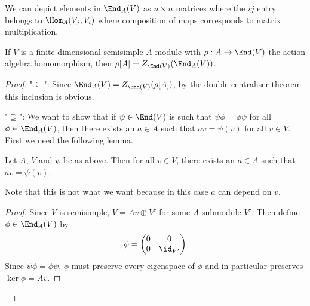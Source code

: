 \begin{cor}
	We can depict elements in $\End_A(V)$ as $n \times n$ matrices where the $ij$ entry belongs to $\Hom_A(V_j,V_i)$ where composition of maps corresponds to matrix multiplication.
\end{cor}

\begin{thm}
	If $V$ is a finite-dimensional semisimple $A$-module with $\rho:A \to \End(V)$ the action algebra homomorphism, then $\rho[A] = Z_{\End(V)}(\End_A(V))$.
\end{thm}

\begin{proof}
  "$\subseteq$":
  Since $\End_A(V) = Z_{\End(V)}(\rho[A])$, by the double centraliser theorem this inclusion is obvious.

  "$\supseteq$":
  We want to show that if $\psi \in \End(V)$ is such that $\psi\phi = \phi\psi$ for all $\phi\in\End_A(V)$, then there exists an $a \in A$ such that $av = \psi(v)$ for all $v \in V$.
  First we need the following lemma.
    
\begin{lem}
	Let $A$, $V$ and $\psi$ be as above.
    Then for all $v \in V$, there exists an $a \in A$ such that $av = \psi(v)$.
\end{lem}

Note that this is not what we want because in this case $a$ can depend on $v$.

\begin{proof}
	Since $V$ is semisimple, $V = Av \oplus V'$ for some $A$-submodule $V'$.
    Then define $\phi\in\End_A(V)$ by
    \[
    	\phi =
        \begin{pmatrix}
        	0 & 0 \\
            0 & \id_{V'}
        \end{pmatrix}
    \]
    Since $\psi\phi = \phi\psi$, $\phi$ must preserve every eigenspace of $\phi$ and in particular preserves $\ker\phi = Av$.
\end{proof}


\end{proof}
